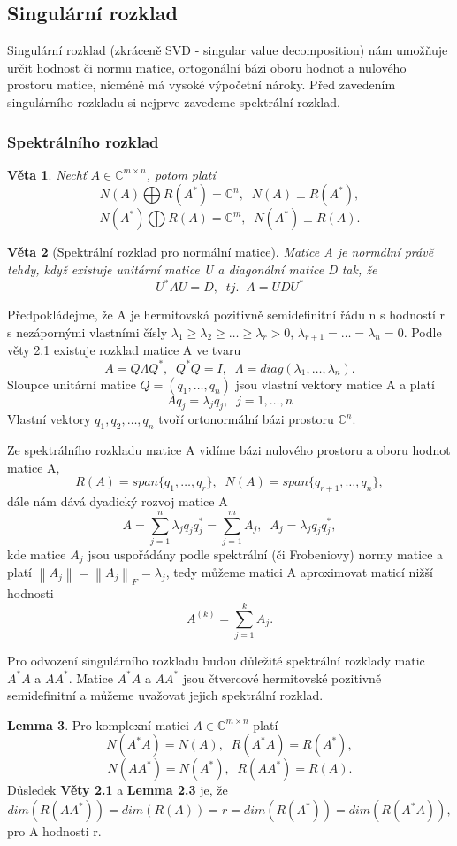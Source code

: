 \documentclass{article}
\theoremstyle{plain}
\newtheorem{veta}{Věta}[section]
\theoremstyle{definition}
\newtheorem{lemma}[veta]{Lemma}
\begin{document}
\subsection{Singulární rozklad}
Singulární rozklad (zkráceně SVD - singular value decomposition) nám umožňuje určit hodnost či normu matice, ortogonální bázi oboru hodnot a nulového prostoru matice, nicméně má vysoké výpočetní nároky. Před zavedením singulárního rozkladu si nejprve zavedeme spektrální rozklad.
\subsubsection{Spektrálního rozklad}
\begin{veta}
Nechť $A \in \mathbb{C}^{m \times n}$, potom platí 
$$N(A) \bigoplus R(A^*) = \mathbb{C}^n,\;\;N(A) \perp R(A^*),$$
$$N(A^*) \bigoplus R(A) = \mathbb{C}^m,\;\;N(A^*) \perp R(A).$$
\end{veta}
\begin{veta}[Spektrální rozklad pro normální matice]
Matice A je normální právě tehdy, když existuje unitární matice U a diagonální matice D tak, že
$$U^{*}AU=D,\;\; tj. \;\;A=UDU^{*}$$
\end{veta}
Předpokládejme, že A je hermitovská pozitivně semidefinitní řádu n s hodností r s nezápornými vlastními čísly $\lambda_1 \geq \lambda_2 \geq \hdots \geq \lambda_r > 0$, $\lambda_{r+1}=\hdots=\lambda_n=0$. Podle věty 2.1 existuje rozklad matice A ve tvaru
$$A=Q\Lambda Q^*,\;\;Q^*Q=I,\;\;\Lambda=diag(\lambda_1,\hdots,\lambda_n).$$
Sloupce unitární matice $Q=(q_1,\hdots,q_n)$ jsou vlastní vektory matice A a platí
$$Aq_j=\lambda_jq_j,\;\;j=1,\hdots,n$$
Vlastní vektory $q_1,q_2,\hdots,q_n$ tvoří ortonormální bázi prostoru $\mathbb{C}^n$.

Ze spektrálního rozkladu matice A vidíme bázi nulového prostoru a oboru hodnot matice A, $$R(A)=span\{q_1,\hdots,q_r\},\;\;N(A)=span\{q_{r+1},\hdots,q_n\},$$ dále nám dává dyadický rozvoj matice A $$A=\sum_{j=1}^{n} \lambda_j q_j q_j^*=\sum_{j=1}^{m}A_j,\;\;A_j=\lambda_j q_j q_j^*,$$ kde matice $A_j$ jsou uspořádány podle spektrální (či Frobeniovy) normy matice a platí $\left \lVert A_j \right \rVert=\left \lVert A_j \right \rVert _F=\lambda_j$, tedy můžeme matici A aproximovat maticí nižší hodnosti $$A^{(k)}=\sum_{j=1}^k A_j.$$

Pro odvození singulárního rozkladu budou důležité spektrální rozklady matic $A^*A$ a $AA^*$. Matice $A^*A$ a $AA^*$ jsou čtvercové hermitovské pozitivně semidefinitní a můžeme uvažovat jejich spektrální rozklad.
\begin{lemma}
Pro komplexní matici $A \in \mathbb{C}^{m \times n}$ platí $$N(A^*A)=N(A),\;\;R(A^*A)=R(A^*),$$
$$N(AA^*)=N(A^*),\;\;R(AA^*)=R(A).$$
Důsledek \textbf{Věty 2.1} a \textbf{Lemma 2.3} je, že 
$$dim(R(AA^*))=dim(R(A))=r=dim(R(A^*))=dim(R(A^*A)),$$
pro A hodnosti r.
\end{lemma}
\end{document}
